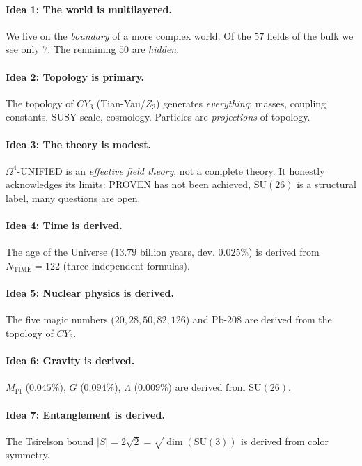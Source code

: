 \documentclass[11pt,a4paper]{article}
\newcommand{\SU}{\mathrm{SU}}
\newcommand{\CY}{CY_3}
\newcommand{\Om}{\Omega^4}
\newcommand{\Mpl}{M_{\text{Pl}}}
\theoremstyle{definition}
\begin{document}
\paragraph{Idea 1: The world is multilayered.}
We live on the \emph{boundary} of a more complex world. Of the $57$ fields 
of the bulk we see only $7$. The remaining $50$ are \emph{hidden}.

\paragraph{Idea 2: Topology is primary.}
The topology of $\CY$ (Tian-Yau/$Z_3$) generates \emph{everything}: masses, 
coupling constants, SUSY scale, cosmology. Particles are 
\emph{projections} of topology.

\paragraph{Idea 3: The theory is modest.}
$\Om$-UNIFIED is an \emph{effective field theory}, not a complete 
theory. It honestly acknowledges its limits: PROVEN has not been achieved, 
$\SU(26)$ is a structural label, many questions are open.

\paragraph{Idea 4: Time is derived.}
The age of the Universe ($13.79$ billion years, dev. $0.025\%$) 
is derived from $N_{\text{TIME}} = 122$ (three independent formulas).

\paragraph{Idea 5: Nuclear physics is derived.}
The five magic numbers ($20, 28, 50, 82, 126$) and Pb-208 
are derived from the topology of $\CY$.

\paragraph{Idea 6: Gravity is derived.}
$\Mpl$ ($0.045\%$), $G$ ($0.094\%$), $\Lambda$ 
($\mathbf{0.009\%}$) are derived from $\SU(26)$.

\paragraph{Idea 7: Entanglement is derived.}
The Tsirelson bound $|S| = 2\sqrt{2} = \sqrt{\dim(\SU(3))}$ 
is derived from color symmetry.
\end{document}
